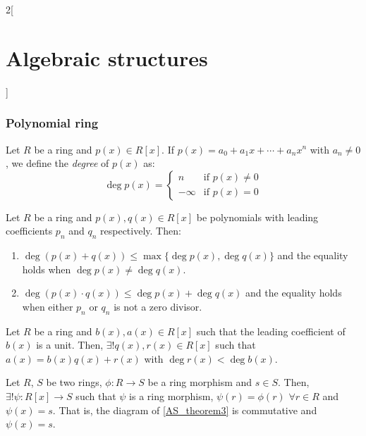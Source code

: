 \documentclass[../../../main_math.tex]{subfiles}
\begin{document}
\begin{multicols}{2}[\section{Algebraic structures}]
  \subsubsection{Polynomial ring}
  \begin{definition}
    Let $R$ be a ring and $p(x)\in R[x]$. If $p(x)=a_0+a_1x+\cdots+a_nx^n$ with $a_n\ne 0$, we define the \emph{degree} of $p(x)$ as:
    \begin{equation*}
      \deg p(x)=
      \begin{cases}
        n       & \text{if }p(x)\ne 0 \\
        -\infty & \text{if }p(x)= 0
      \end{cases}
    \end{equation*}
  \end{definition}
  \begin{proposition}\label{AS_deg}
    Let $R$ be a ring and $p(x),q(x)\in R[x]$ be polynomials with leading coefficients $p_n$ and $q_n$ respectively. Then:
    \begin{enumerate}
      \item $\deg(p(x)+q(x))\leq\max\{\deg p(x),\deg q(x)\}$ and the equality holds when $\deg p(x)\ne\deg q(x)$.
      \item $\deg(p(x)\cdot q(x))\leq\deg p(x)+\deg q(x)$ and the equality holds when either $p_n$ or $q_n$ is not a zero divisor.
    \end{enumerate}
  \end{proposition}
  \begin{proposition}
    Let $R$ be a ring and $b(x),a(x)\in R[x]$ such that the leading coefficient of $b(x)$ is a unit. Then, $\exists! q(x),r(x)\in R[x]$ such that $a(x)=b(x)q(x)+r(x)$ with $\deg r(x)<\deg b(x)$.
  \end{proposition}
  \begin{proposition}
    Let $R$, $S$ be two rings, $\phi:R\rightarrow S$ be a ring morphism and $s\in S$. Then, $\exists!\psi:R[x]\rightarrow S$ such that $\psi$ is a ring morphism, $\psi(r)=\phi(r)$ $\forall r\in R$ and $\psi(x)=s$. That is, the diagram of \cref{AS_theorem3} is commutative and $\psi(x)=s$.
    \begin{center}
      \begin{minipage}{\linewidth}
        \centering
        
        \label{AS_theorem3}
      \end{minipage}
    \end{center}

\end{proposition}
\end{multicols}
\end{document}
